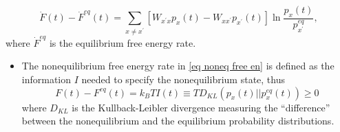 \documentclass[final]{beamer}
\newlength{\colwidth}
\begin{document}
\begin{frame}[t]
\begin{columns}[t]
\begin{column}{\colwidth}
\begin{block}{}
\begin{equation}
\label{eq noneq free en}
\dot{F}(t) - \dot{F}^{eq}(t)= \sum_{x \neq x^\prime} \left[ W_{x^\prime x} p_x(t) -  W_{x x^\prime}p_{x^\prime}(t) \right] \ln \frac{p_x(t)}{p_{x^\prime}^{eq}},
\end{equation}
%
where $\dot{F}^{eq}$ is the equilibrium free energy rate.
\begin{itemize}
\item The nonequilibrium free energy rate in \eqref{eq noneq free en} is defined as the information $I$ needed to specify the nonequilibrium state\cite{Esposito_2011}, thus
%
\begin{equation}
{F}(t) - {F}^{eq}(t) = k_B TI(t) \equiv TD_{KL}(p_x(t) || p_x^{eq}(t)) \geq 0
\end{equation}
%
where $D_{KL}$ is the Kullback-Leibler divergence measuring the ``difference'' between the nonequilibrium and the equilibrium probability distributions.
\end{itemize}
\end{block}


\end{column}
\end{columns}
\end{frame}
\end{document}
